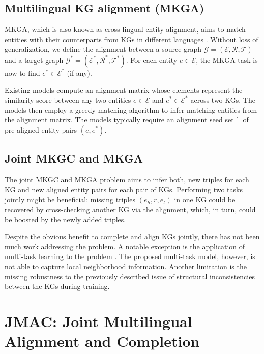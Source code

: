 \documentclass[11pt]{article}
\begin{document}
\subsection{Multilingual KG alignment (MKGA)}\label{ssec:mkga}

MKGA, which is also known as cross-lingual entity alignment, aims to match entities with their counterparts from KGs in different languages \cite{MTransE,wang2018cross,wu2019relation, sun2020knowledge}. Without loss of generalization, we define the alignment between a source graph $\mathcal{G} = ({\mathcal{E}}, {\mathcal{R}}, {\mathcal{T}})$ and a target graph $\mathcal{G}^* = ({\mathcal{E}}^*, {\mathcal{R}}^*, {\mathcal{T}}^*)$. For each entity $e \in \mathcal{E}$, the MKGA task is now to find $e^* \in \mathcal{E}^*$ (if any). 


Existing models compute an alignment matrix whose elements represent the similarity score between any two entities  $e \in \mathcal{E}$ and $e^* \in \mathcal{E}^*$ across two KGs. The models then employ a greedy matching algorithm \cite{greedymatch} to infer matching entities from the alignment matrix. The models typically require an alignment seed set $\mathbb{L}$ of pre-aligned entity pairs $(e, e^*)$.


\subsection{Joint MKGC and MKGA} 

The joint MKGC and MKGA problem aims to infer both, new triples for each KG and new aligned entity pairs for each pair of KGs. Performing two tasks jointly might be beneficial:  missing triples $(e_h, r, e_t) $ in one KG could be recovered by cross-checking another KG via the alignment, which, in turn, could be boosted by the newly added triples. 

Despite the obvious benefit to complete and align KGs jointly, there has not been much work addressing the problem. A notable exception is the application of multi-task learning to the problem \cite{singh2021multilingual}.  The proposed multi-task model, however, is not able to capture local neighborhood information. Another limitation is the  missing robustness to the previously described issue of structural inconsistencies between the  KGs during training.

\section{JMAC: Joint Multilingual Alignment and Completion}
\end{document}
